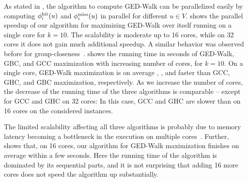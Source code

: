 As stated in , the algorithm to compute GED-Walk
can be parallelized easily by computing $\phi^{\text{hit}}_i(u)$ and $\phi^{\text{miss}}_i(u)$ in
parallel for different $u \in V$.  shows
the parallel speedup of our algorithm for maximizing GED-Walk over itself
running on a single core for $k = 10$.
The scalability is moderate up to 16 cores, while on 32 cores it does not gain much
additional speedup. A similar behavior was observed before for
group-closeness~\cite{DBLP:conf/alenex/BergaminiGM18}. 
shows the running time in seconds of GED-Walk, GBC, and GCC maximization with increasing
number of cores, for $k = 10$.
On a single core, GED-Walk maximization is on average
\gedAlgoSpeedupGCC, \gedAlgoSpeedupGHC, and \gedAlgoSpeedupGBC faster than GCC,
GHC, and GBC maximization, respectively.
As we increase the number of cores, the decrease of the running time of the
three algorithms is comparable -- except for GCC and GHC on 32 cores: In this
case, GCC and GHC are slower than on 16 cores on the considered instances.

The limited scalability affecting all three algorithms is probably due to memory
latency becoming a bottleneck in the execution on multiple
cores~\cite{DBLP:conf/icpp/BaderCF05,DBLP:journals/ppl/LumsdaineGHB07}.
Further,  shows that, on 16 cores, our
algorithm for GED-Walk maximization finishes on average within a few seconds.
Here the running time of the algorithm is dominated by its sequential parts,
and it is not surprising that adding 16 more cores does not speed the algorithm
up substantially.

